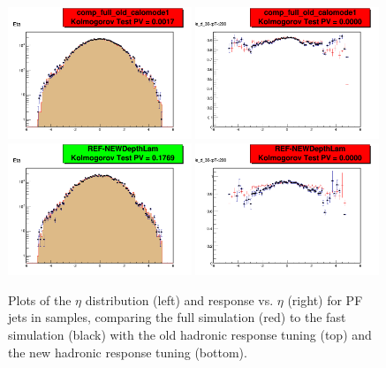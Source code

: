 \begin{figure}[hbtp]
\begin{center}
\includegraphics[width=0.49\textwidth]{figures/Eta_full_vs_fast_old.png}
\includegraphics[width=0.49\textwidth]{figures/pTScale_d_30_pT_200_full_vs_fast_old.png}
\includegraphics[width=0.49\textwidth]{figures/Eta_full_vs_fast_new.png}
\includegraphics[width=0.49\textwidth]{figures/pTScale_d_30_pT_200_full_vs_fast_new.png}
\caption{Plots of the $\eta$ distribution (left) and \pt response vs. $\eta$ (right) for PF jets in \ttbar samples, comparing the full simulation (red) to the fast simulation (black) with the old hadronic response tuning (top) and the new hadronic response tuning (bottom).}
\label{fig:cballD-relvals}
\end{center}
\end{figure}

